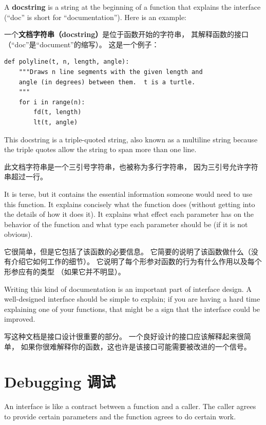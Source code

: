 \documentclass[10pt]{book}
\begin{document}
\begin{CJK}{UTF8}{gbsn}
A {\bf docstring} is a string at the beginning of a function that
explains the interface (``doc'' is short for ``documentation'').  Here
is an example:

一个{\bf 文档字符串（docstring）}是位于函数开始的字符串，
其解释函数的接口（``doc''是``document''的缩写）。
这是一个例子：

\begin{verbatim}
def polyline(t, n, length, angle):
    """Draws n line segments with the given length and
    angle (in degrees) between them.  t is a turtle.
    """    
    for i in range(n):
        fd(t, length)
        lt(t, angle)
\end{verbatim}
%
This docstring is a triple-quoted string, also known
as a multiline string because the triple quotes allow the string
to span more than one line.

此文档字符串是一个三引号字符串，也被称为多行字符串，
因为三引号允许字符串超过一行。

It is terse, but it contains the essential information
someone would need to use this function.  It explains concisely what
the function does (without getting into the details of how it does
it).  It explains what effect each parameter has on the behavior of
the function and what type each parameter should be (if it is not
obvious).

它很简单，但是它包括了该函数的必要信息。
它简要的说明了该函数做什么（没有介绍它如何工作的细节）。
它说明了每个形参对函数的行为有什么作用以及每个形参应有的类型
（如果它并不明显）。

Writing this kind of documentation is an important part of interface
design.  A well-designed interface should be simple to explain;
if you are having a hard time explaining one of your functions,
that might be a sign that the interface could be improved.

写这种文档是接口设计很重要的部分。
一个良好设计的接口应该解释起来很简单，
如果你很难解释你的函数，这也许是该接口可能需要被改进的一个信号。


\section{Debugging 调试}

An interface is like a contract between a function and a caller.
The caller agrees to provide certain parameters and the function
agrees to do certain work.


\end{CJK}
\end{document}
